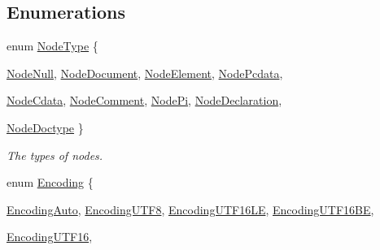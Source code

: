 \subsection*{Enumerations}
\begin{DoxyCompactItemize}
\item 
enum \hyperlink{namespacephys_1_1xml_a668b0cc666a9d49f7c7222a7552115d3}{NodeType} \{ \par
\hyperlink{namespacephys_1_1xml_a668b0cc666a9d49f7c7222a7552115d3af6e95d4a0b6115c76b339961bc58d742}{NodeNull}, 
\hyperlink{namespacephys_1_1xml_a668b0cc666a9d49f7c7222a7552115d3acfe92e6bd275972917b95f08bd46e09f}{NodeDocument}, 
\hyperlink{namespacephys_1_1xml_a668b0cc666a9d49f7c7222a7552115d3a92facb9678134df6404ce63e7e48624c}{NodeElement}, 
\hyperlink{namespacephys_1_1xml_a668b0cc666a9d49f7c7222a7552115d3ab48d4b88d7a7757e3e8505c90db3b2bf}{NodePcdata}, 
\par
\hyperlink{namespacephys_1_1xml_a668b0cc666a9d49f7c7222a7552115d3a353968e806a751a6da4f7ac115b4ab55}{NodeCdata}, 
\hyperlink{namespacephys_1_1xml_a668b0cc666a9d49f7c7222a7552115d3a25b778cb61ae0a9f15590cad5e0120d2}{NodeComment}, 
\hyperlink{namespacephys_1_1xml_a668b0cc666a9d49f7c7222a7552115d3a3c09d11be0cea840f23f55e084cf72fa}{NodePi}, 
\hyperlink{namespacephys_1_1xml_a668b0cc666a9d49f7c7222a7552115d3a1e3789aa995b7bf563ca8c43553ac035}{NodeDeclaration}, 
\par
\hyperlink{namespacephys_1_1xml_a668b0cc666a9d49f7c7222a7552115d3a079e78516a732a77616552ddaebd7883}{NodeDoctype}
 \}
\begin{DoxyCompactList}\small\item\em The types of nodes. \item\end{DoxyCompactList}\item 
enum \hyperlink{namespacephys_1_1xml_a420f5de782438f88160321385bea2015}{Encoding} \{ \par
\hyperlink{namespacephys_1_1xml_a420f5de782438f88160321385bea2015a2792ef334e1061e7ad177df463256d85}{EncodingAuto}, 
\hyperlink{namespacephys_1_1xml_a420f5de782438f88160321385bea2015a7793b4cde174342c9450abbeab675743}{EncodingUTF8}, 
\hyperlink{namespacephys_1_1xml_a420f5de782438f88160321385bea2015aa5e6a756e80683f376d1ef0a03b21d56}{EncodingUTF16LE}, 
\hyperlink{namespacephys_1_1xml_a420f5de782438f88160321385bea2015a04fd7b1fef8d2dcc67a46b8fe4dbcaf4}{EncodingUTF16BE}, 
\par
\hyperlink{namespacephys_1_1xml_a420f5de782438f88160321385bea2015ac19070aaf7044426b0fe8fa5af956130}{EncodingUTF16}, 

\end{DoxyCompactItemize}
